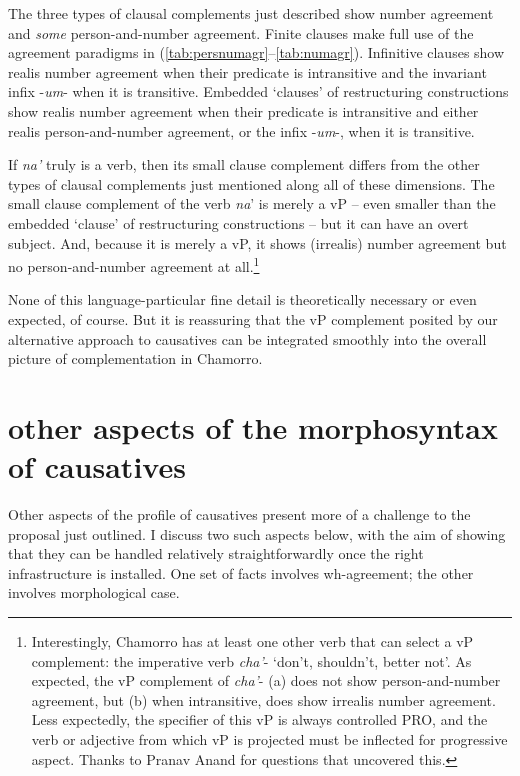 \documentclass[output=paper,
modfonts
]{LSP/langsci}
\begin{document}
\begin{exe}
\begin{xlist}
The three types of clausal complements just described show number
agreement and \emph{some} person-and-number agreement. Finite clauses
make full use of the agreement paradigms in (\ref{tab:persnumagr}--\ref{tab:numagr}). Infinitive clauses
show realis number agreement when their predicate is intransitive and
the invariant infix -\emph{um}- when it is transitive. Embedded
`clauses' of restructuring constructions show realis number agreement when their
predicate is intransitive and either realis person-and-number agreement,
or the infix -\emph{um}-, when it is transitive.

If \emph{na'} truly is a verb, then its small clause complement differs
from the other types of clausal complements just mentioned along all of
these dimensions. The small clause complement of the verb \emph{na}' is
merely a vP -- even smaller than the embedded `clause' of
restructuring constructions -- but it can have an overt subject. And, because it is
merely a vP, it shows (irrealis) number agreement but no
person-and-number agreement at all.\footnote{Interestingly, Chamorro has
  at least one other verb that can select a vP complement: the
  imperative verb \emph{cha'}- `don't, shouldn't, better not'. As
  expected, the vP complement of \emph{cha'}- (a) does not show
  person-and-number agreement, but (b) when intransitive, does show
  irrealis number agreement. Less expectedly, the specifier of this vP
  is always controlled PRO, and the verb or adjective from which vP is
  projected must be inflected for progressive aspect. Thanks to Pranav
  Anand for questions that uncovered this.}

None of this language-particular fine detail is theoretically necessary
or even expected, of course. But it is reassuring that the vP complement
posited by our alternative approach to causatives can be integrated
smoothly into the overall picture of complementation in Chamorro.

\section{other aspects of the morphosyntax of causatives}

Other aspects of the profile of causatives present more of a challenge
to the proposal just outlined. I discuss two such aspects below, with
the aim of showing that they can be handled relatively straightforwardly
once the right infrastructure is installed. One set of facts involves
wh-agreement; the other involves morphological case.


\end{xlist}
\end{exe}
\end{document}
